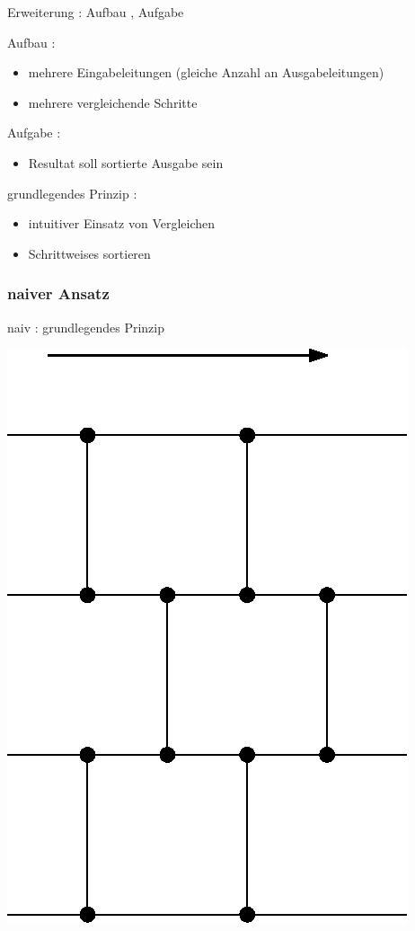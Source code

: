 \documentclass[ucs,9pt]{beamer}
\begin{document}
\begin{frame}{Erweiterung : Aufbau , Aufgabe}
 { Aufbau :\\ \begin{itemize}
        \item mehrere Eingabeleitungen (gleiche Anzahl an Ausgabeleitungen)
        \item mehrere vergleichende Schritte
    \end{itemize}}
 {Aufgabe :\\
        \begin{itemize}
            \item Resultat soll sortierte Ausgabe sein
            \end{itemize}
            }
 {grundlegendes Prinzip :
        \begin{itemize}
            \item intuitiver Einsatz von Vergleichen
            \item Schrittweises sortieren
        \end{itemize}}
\end{frame}

\subsubsection*{naiver Ansatz}

\begin{frame}{naiv : grundlegendes Prinzip}
\begin{center}
    \includegraphics[scale=0.8]{bild2Komparatornetzwerk.eps}
\end{center}
\end{frame}
\end{document}
